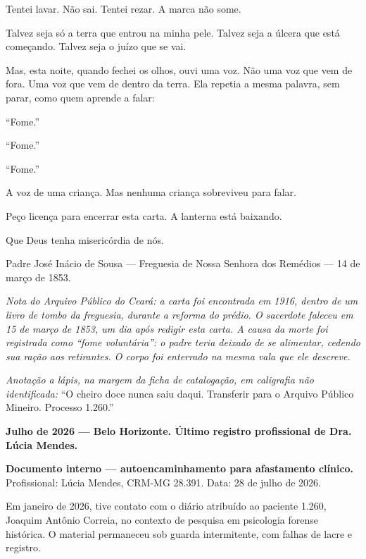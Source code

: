\noindent Tentei lavar. Não sai. Tentei rezar. A marca não some.

\noindent Talvez seja só a terra que entrou na minha pele. Talvez seja a úlcera que está começando. Talvez seja o juízo que se vai.

\noindent Mas, esta noite, quando fechei os olhos, ouvi uma voz. Não uma voz que vem de fora. Uma voz que vem de dentro da terra. Ela repetia a mesma palavra, sem parar, como quem aprende a falar:

\noindent ``Fome.''

\noindent ``Fome.''

\noindent ``Fome.''

\noindent A voz de uma criança. Mas nenhuma criança sobreviveu para falar.

\noindent Peço licença para encerrar esta carta. A lanterna está baixando.

\noindent Que Deus tenha misericórdia de nós.

\vspace{0.5em}
\noindent Padre José Inácio de Sousa --- Freguesia de Nossa Senhora dos Remédios --- 14 de março de 1853.

\vspace{0.8em}
\noindent \textit{Nota do Arquivo Público do Ceará: a carta foi encontrada em 1916, dentro de um livro de tombo da freguesia, durante a reforma do prédio. O sacerdote faleceu em 15 de março de 1853, um dia após redigir esta carta. A causa da morte foi registrada como ``fome voluntária'': o padre teria deixado de se alimentar, cedendo sua ração aos retirantes. O corpo foi enterrado na mesma vala que ele descreve.}

\vspace{0.5em}
\noindent \textit{Anotação a lápis, na margem da ficha de catalogação, em caligrafia não identificada:} ``O cheiro doce nunca saiu daqui. Transferir para o Arquivo Público Mineiro. Processo 1.260.''

\vspace{1em}
\noindent \textbf{Julho de 2026 --- Belo Horizonte. Último registro profissional de Dra. Lúcia Mendes.}

\noindent \textbf{Documento interno --- autoencaminhamento para afastamento clínico.} Profissional: Lúcia Mendes, CRM-MG 28.391. Data: 28 de julho de 2026.

\noindent Em janeiro de 2026, tive contato com o diário atribuído ao paciente 1.260, Joaquim Antônio Correia, no contexto de pesquisa em psicologia forense histórica. O material permaneceu sob guarda intermitente, com falhas de lacre e registro.

